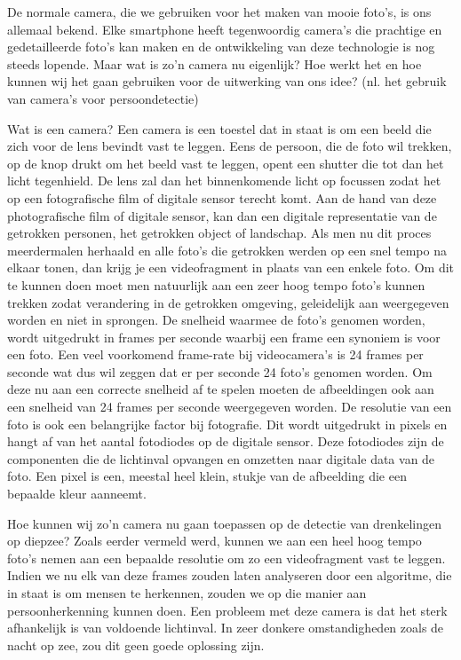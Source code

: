 \subitem
De normale camera, die we gebruiken voor het maken van mooie foto's, is ons allemaal bekend. Elke smartphone heeft tegenwoordig camera's die prachtige en gedetailleerde foto's kan maken en de ontwikkeling van deze technologie is nog steeds lopende. Maar wat is zo'n camera nu eigenlijk? Hoe werkt het en hoe kunnen wij het gaan gebruiken voor de uitwerking van ons idee? (nl. het gebruik van camera's voor persoondetectie)

\subitem
Wat is een camera? Een camera is een toestel dat in staat is om een beeld die zich voor de lens bevindt vast te leggen. Eens de persoon, die de foto wil trekken, op de knop drukt om het beeld vast te leggen, opent een shutter die tot dan het licht tegenhield. De lens zal dan het binnenkomende licht op focussen zodat het op een fotografische film of digitale sensor terecht komt. Aan de hand van deze photografische film of digitale sensor, kan dan een digitale representatie van de getrokken personen, het getrokken object of landschap. Als men nu dit proces meerdermalen herhaald en alle foto's die getrokken werden op een snel tempo na elkaar tonen, dan krijg je een videofragment in plaats van een enkele foto. Om dit te kunnen doen moet men natuurlijk aan een zeer hoog tempo foto's kunnen trekken zodat verandering in de getrokken omgeving, geleidelijk aan weergegeven worden en niet in sprongen. De snelheid waarmee de foto's genomen worden, wordt uitgedrukt in frames per seconde waarbij een frame een synoniem is voor een foto. Een veel voorkomend frame-rate bij videocamera's is 24 frames per seconde wat dus wil zeggen dat er per seconde 24 foto's genomen worden. Om deze nu aan een correcte snelheid af te spelen moeten de afbeeldingen ook aan een snelheid van 24 frames per seconde weergegeven worden. De resolutie van een foto is ook een belangrijke factor bij fotografie. Dit wordt uitgedrukt in pixels en hangt af van het aantal fotodiodes op de digitale sensor. Deze fotodiodes zijn de componenten die de lichtinval opvangen en omzetten naar digitale data van de foto. Een pixel is een, meestal heel klein, stukje van de afbeelding die een bepaalde kleur aanneemt. 

\subitem
Hoe kunnen wij zo'n camera nu gaan toepassen op de detectie van drenkelingen op diepzee? Zoals eerder vermeld werd, kunnen we aan een heel hoog tempo foto's nemen aan een bepaalde resolutie om zo een videofragment vast te leggen. Indien we nu elk van deze frames zouden laten analyseren door een algoritme, die in staat is om mensen te herkennen, zouden we op die manier aan persoonherkenning kunnen doen. Een probleem met deze camera is dat het sterk afhankelijk is van voldoende lichtinval. In zeer donkere omstandigheden zoals de nacht op zee, zou dit geen goede oplossing zijn. 

